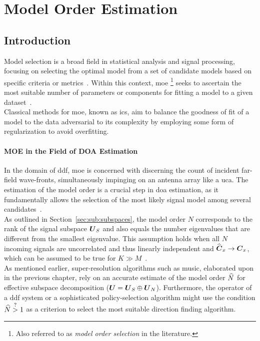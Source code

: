 \chapter{Model Order Estimation}
\label{ch:ModelOrderEstimation}

\section{Introduction}
Model selection is a broad field in statistical analysis and signal processing, focusing on selecting the optimal model
from a set of candidate models based on specific criteria or metrics~\cite{costa2009}.
Within this context, \glsdesc{moe}%
\footnote{%
    Also referred to as \textit{model order selection} in the literature.
}
seeks to ascertain the most suitable number of parameters or components for fitting a model to a given dataset~\cite{barthelme2020}.\\
Classical methods for \gls{moe}, known as \glspl{ic}, aim to balance the goodness of fit of a model to the data
adversarial to its complexity by employing some form of regularization to avoid overfitting.

\subsubsection*{MOE in the Field of DOA Estimation}
In the domain of \gls{ddf}, \gls{moe} is concerned with discerning the count of incident far-field wave-fronts,
simultaneously impinging on an antenna array like a \gls{uca}.
The estimation of the model order is a crucial step in \gls{doa} estimation, as it fundamentally allows the selection
of the most likely signal model among several candidates~\cite{barthelme2020}.\\
As outlined in Section~\ref{sec:sub:subspaces}, the model order \( N \) corresponds to the rank of the signal subspace
\( \boldsymbol{U}_S \) and also equals the number eigenvalues that are different from the smallest eigenvalue.
This assumption holds when all \( N \) incoming signals are uncorrelated and thus linearly independent and \( \widehat{\boldsymbol{C}}_x \rightarrow \boldsymbol{C}_x \),
which can be assumed to be true for \( K \gg M \)~\cite{trees.ch7}.\\
As mentioned earlier, super-resolution algorithms such as \gls{music}, elaborated upon in the previous
chapter, rely on an accurate estimate of the model order \( \widehat{N} \) for effective subspace decomposition (\( \boldsymbol{U} = \boldsymbol{U}_S \oplus \boldsymbol{U}_N \)).
Furthermore, the operator of a \gls{ddf} system or a sophisticated policy-selection algorithm might use the condition
\( \widehat{N} \overset{?}{>} 1 \) as a criterion to select the most suitable direction finding algorithm.


